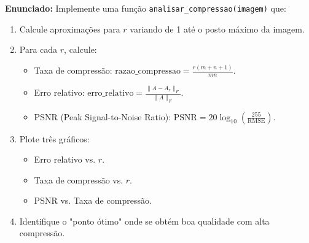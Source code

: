 \documentclass[a4paper,12pt]{article}
\begin{document}
\textbf{Enunciado:}
Implemente uma função \texttt{analisar\_compressao(imagem)} que:
\begin{enumerate}
    \item Calcule aproximações para $r$ variando de 1 até o posto máximo da imagem.
    \item Para cada $r$, calcule:
    \begin{itemize}
        \item Taxa de compressão: $\text{razao\_compressao} = \frac{r(m+n+1)}{mn}$.
        \item Erro relativo: $\text{erro\_relativo} = \frac{\|A - A_r\|_F}{\|A\|_F}$.
        \item PSNR (Peak Signal-to-Noise Ratio): $\text{PSNR} = 20 \log_{10}\left(\frac{255}{\text{RMSE}}\right)$.
    \end{itemize}
    \item Plote três gráficos:
    \begin{itemize}
        \item Erro relativo vs. $r$.
        \item Taxa de compressão vs. $r$.
        \item PSNR vs. Taxa de compressão.
    \end{itemize}
    \item Identifique o "ponto ótimo" onde se obtém boa qualidade com alta compressão.
\end{enumerate}
\end{document}
